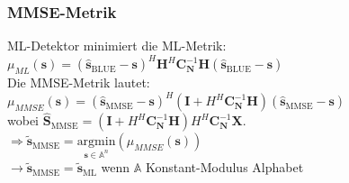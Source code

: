 \documentclass[a4paper,landscape,6pt]{article}
\newcommand{\ma}[1]{\ensuremath{\boldsymbol {#1}}}								%
\renewcommand{\vec}[1]{\ensuremath{\boldsymbol {#1}}}							%
\begin{document}
\begin{multicols}{3}
\subsubsection*{MMSE-Metrik}
ML-Detektor minimiert die ML-Metrik:\\
$\mu_{ML}(\vec s) = (\hat{\vec s}_{\text{BLUE}} - \vec s)^H \ma H^H \ma C_{\vec N}^{-1}\ma H (\hat{\vec s}_{\text{BLUE}} - \vec s)$\\
Die MMSE-Metrik lautet:\\
$\mu_{MMSE}(\vec s) = (\hat{\vec s}_{\text{MMSE}} - \vec s)^H (\ma I + H^H \ma C_{\vec N}^{-1}\ma H )(\hat{\vec s}_{\text{MMSE}} - \vec s)$\\
wobei $\hat{\vec S}_{\text{MMSE}} = (\ma I + H^H \ma C_{\vec N}^{-1}\ma H ) H^H \ma C_{\vec N}^{-1} \vec X$.\\
$\Rightarrow \tilde{\vec s}_{\text{MMSE}} =  \underset{\vec s \in \mathbb{A}^n}{\text{argmin}} \left( \mu_{MMSE}(\vec s) \right) $\\
$\rightarrow \tilde{\vec s}_{\text{MMSE}} = \tilde{\vec s}_{\text{ML}}$ wenn $\mathbb{A}$ Konstant-Modulus Alphabet

\end{multicols}
\end{document}
